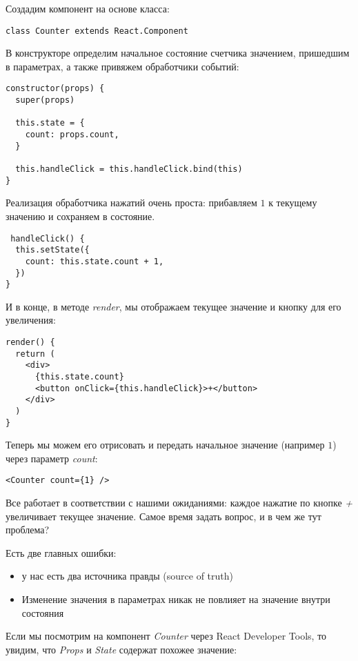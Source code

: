 Создадим компонент на основе класса:

\begin{lstlisting}
class Counter extends React.Component
\end{lstlisting}

В конструкторе определим начальное состояние счетчика значением, пришедшим в параметрах, а также привяжем обработчики событий:

\begin{lstlisting}
constructor(props) {
  super(props)
  
  this.state = {
    count: props.count,
  }
  
  this.handleClick = this.handleClick.bind(this)
}
\end{lstlisting}

Реализация обработчика нажатий очень проста: прибавляем $1$ к текущему значению и сохраняем в состояние.

\begin{lstlisting}
 handleClick() {
  this.setState({
    count: this.state.count + 1,
  })
}
\end{lstlisting}

И в конце, в методе \textit{render}, мы отображаем текущее значение и кнопку для его увеличения:

\begin{lstlisting}
render() {
  return (
    <div>
      {this.state.count}
      <button onClick={this.handleClick}>+</button>
    </div>
  )
}
\end{lstlisting}

Теперь мы можем его отрисовать и передать начальное значение (например $1$) через параметр \textit{count}:

\begin{lstlisting}
<Counter count={1} />
\end{lstlisting}

Все работает в соответствии с нашими ожиданиями: каждое нажатие по кнопке \textit{+} увеличивает текущее значение. Самое время задать вопрос, и в чем же тут проблема?

Есть две главных ошибки:

\begin{itemize}
  \item у нас есть два источника правды (source of truth)
  \item Изменение значения в параметрах никак не повлияет на значение внутри состояния
\end{itemize}

Если мы посмотрим на компонент \textit{Counter} через React Developer Tools, то увидим, что \textit{Props} и \textit{State} содержат похожее значение:

